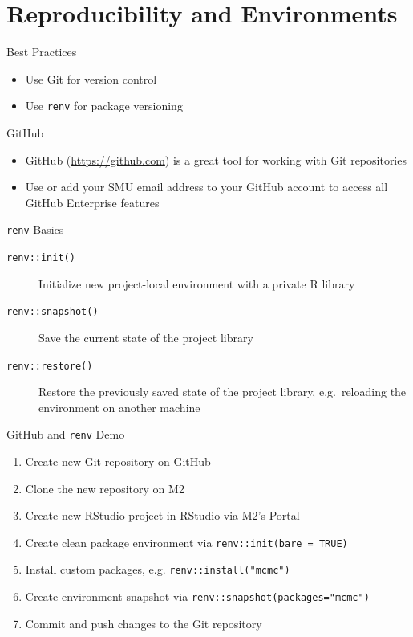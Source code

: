 \documentclass[aspectratio=169]{beamer}
\begin{document}
\section{Reproducibility and Environments}

\begin{frame}{Best Practices}
\begin{itemize}
\item Use Git for version control
\item Use \texttt{renv} for package versioning
\end{itemize}
\end{frame}

\begin{frame}{GitHub}
\begin{itemize}
\item GitHub (\url{https://github.com}) is a great tool for working with Git repositories
\item Use or add your SMU email address to your GitHub account to access all GitHub Enterprise features
\end{itemize}
\end{frame}


\begin{frame}{\texttt{renv} Basics}
\begin{description}
\item[\texttt{renv::init()}] Initialize new project-local environment with a private R library
\item[\texttt{renv::snapshot()}] Save the current state of the project library
\item[\texttt{renv::restore()}] Restore the previously saved state of the project library, e.g.\ reloading the environment on another machine
\end{description}
\end{frame}

\begin{frame}{GitHub and \texttt{renv} Demo}
\begin{enumerate}
\item Create new Git repository on GitHub
\item Clone the new repository on M2
\item Create new RStudio project in RStudio via M2's Portal
\item Create clean package environment via \texttt{renv::init(bare = TRUE)}
\item Install custom packages, e.g. \texttt{renv::install("mcmc")}
\item Create environment snapshot via \texttt{renv::snapshot(packages="mcmc")}
\item Commit and push changes to the Git repository
\end{enumerate}

\end{frame}
\end{document}
